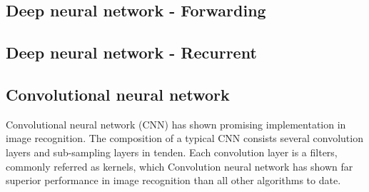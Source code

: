 \subsection{Deep neural network - Forwarding}
\subsection{Deep neural network - Recurrent}
\subsection{Convolutional neural network}
Convolutional neural network (CNN) has shown promising implementation in image recognition. The composition of a typical CNN consists several convolution layers and sub-sampling layers in tenden. Each convolution layer is a filters, commonly referred as kernels, which  
Convolution neural network has shown far superior performance in image recognition than all other algorithms to date.~\cite{Szegedy_2015}